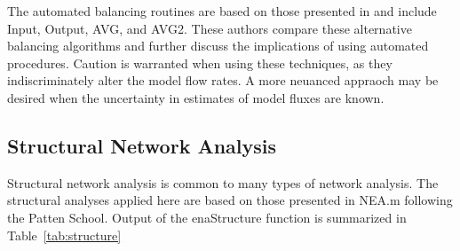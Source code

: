 \documentclass[article]{jss}
\begin{document}
The automated balancing routines are based on those presented in
\citet{allesina03} and include Input, Output, AVG, and AVG2.  These authors compare these alternative balancing algorithms and further discuss the implications of using automated
procedures.  Caution is warranted when using these techniques, as they
indiscriminately alter the model flow rates.  A more neuanced appraoch may be desired when the uncertainty in estimates of model fluxes are known.

\subsection{Structural Network Analysis}

Structural network analysis is common to many types of network
analysis.  The structural analyses applied here are based on those
presented in NEA.m \citep{fath06} following the Patten School.  Output
of the enaStructure function is summarized in Table~\ref{tab:structure}
\end{document}
